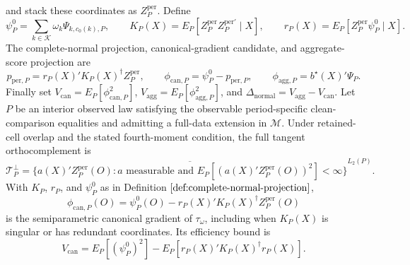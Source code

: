 and stack these coordinates as \(Z_P^{\mathrm{per}}\).  Define
\[
\psi_P^0=\sum_{k\in\mathcal K}\omega_k\Psi_{k,c_0(k),P},\qquad
K_P(X)=E_P[Z_P^{\mathrm{per}}Z_P^{\mathrm{per}\prime}\mid X],\qquad
r_P(X)=E_P[Z_P^{\mathrm{per}}\psi_P^0\mid X].
\]
The complete-normal projection, canonical-gradient candidate, and aggregate-score projection are
\[
p_{\mathrm{per},P}=r_P(X)'K_P(X)^\dagger Z_P^{\mathrm{per}},\qquad
\phi_{\mathrm{can},P}=\psi_P^0-p_{\mathrm{per},P},\qquad
\phi_{\mathrm{agg},P}=b^\star(X)'\Psi_P.
\]
Finally set \(V_{\mathrm{can}}=E_P[\phi_{\mathrm{can},P}^2]\), \(V_{\mathrm{agg}}=E_P[\phi_{\mathrm{agg},P}^2]\), and \(\Delta_{\mathrm{normal}}=V_{\mathrm{agg}}-V_{\mathrm{can}}\).
Let \(P\) be an interior observed law satisfying the observable period-specific clean-comparison equalities and admitting a full-data extension in \(\mathcal M\).  Under retained-cell overlap and the stated fourth-moment condition, the full tangent orthocomplement is
\[
\mathcal T_P^\perp
=\overline{\{a(X)'Z_P^{\mathrm{per}}(O):a\text{ measurable and }
E_P[(a(X)'Z_P^{\mathrm{per}}(O))^2]<\infty\}}^{L_2(P)}.
\]
With \(K_P\), \(r_P\), and \(\psi_P^0\) as in Definition \(\ref{def:complete-normal-projection}\),
\[
\phi_{\mathrm{can},P}(O)
=\psi_P^0(O)-r_P(X)'K_P(X)^\dagger Z_P^{\mathrm{per}}(O)
\]
is the semiparametric canonical gradient of \(\tau_\omega\), including when \(K_P(X)\) is singular or has redundant coordinates.  Its efficiency bound is
\[
V_{\mathrm{can}}
=E_P[(\psi_P^0)^2]-E_P[r_P(X)'K_P(X)^\dagger r_P(X)].
\]

